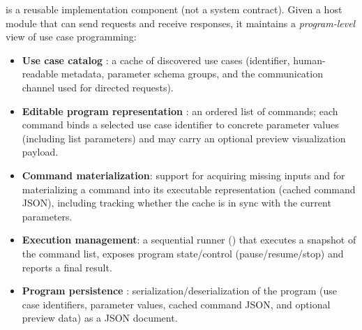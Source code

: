  is a reusable implementation component (not a system contract). Given a host module that can send requests and receive responses, it maintains a \emph{program-level} view of use case programming:
\begin{itemize}
    \item \textbf{Use case catalog} : a cache of discovered use cases (identifier, human-readable metadata, parameter schema groups, and the communication channel used for directed requests).
    \item \textbf{Editable program representation} : an ordered list of commands; each command binds a selected use case identifier to concrete parameter values (including list parameters) and may carry an optional preview visualization payload.
    \item \textbf{Command materialization}: support for acquiring missing  inputs  and for materializing a command into its executable representation  (cached command JSON), including tracking whether the cache is in sync with the current parameters.
    \item \textbf{Execution management}: a sequential runner () that executes a snapshot of the command list, exposes program state/control  (pause/resume/stop) and reports a final result.
    \item \textbf{Program persistence} : serialization/deserialization of the program (use case identifiers, parameter values, cached command JSON, and optional preview data) as a JSON document.
\end{itemize}

